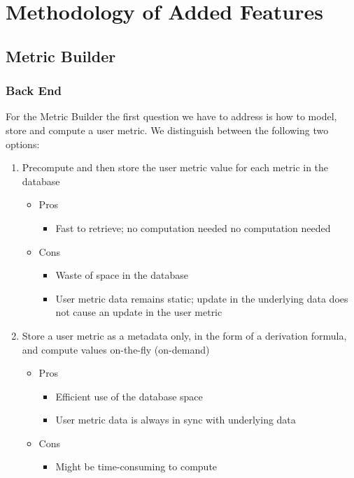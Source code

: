 \chapter{Methodology of Added Features}

	\section{Metric Builder}

		\subsection{Back End}

			For the Metric Builder the first question we have to address is how to model, store and compute a user metric.
			We distinguish between the following two options:

			\begin{enumerate}[itemsep=-1.5mm]
				\item
					Precompute and then store the user metric value for each metric in the database
					\begin{itemize}[itemsep=-1.5mm]
						\item
							Pros
							\begin{itemize}
								\item
									Fast to retrieve; no computation needed 
									no computation needed
							\end{itemize}
						\item
							Cons
							\begin{itemize}
								\item
									Waste of space in the database
								\item
									User metric data remains static;
									update in the underlying data does not cause an update in the user metric
							\end{itemize}
					\end{itemize}
				\item
					Store a user metric as a metadata only, in the form of a derivation formula, and compute values on-the-fly (on-demand)
					\begin{itemize}[itemsep=-1.5mm]
						\item
							Pros
							\begin{itemize}
								\item
									Efficient use of the database space
								\item
									User metric data is always in sync with underlying data
							\end{itemize}
						\item
							Cons
							\begin{itemize}
								\item
									Might be time-consuming to compute
							\end{itemize}
					\end{itemize}
			\end{enumerate}

